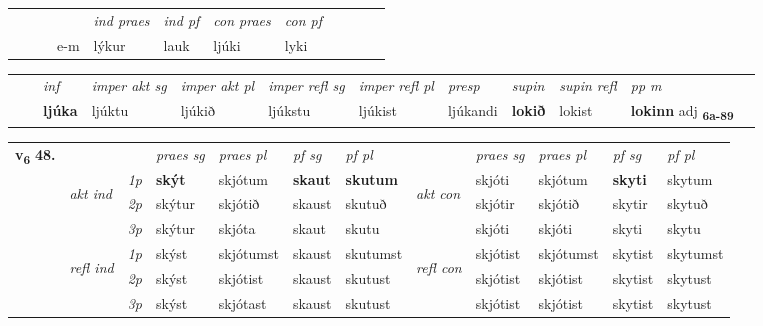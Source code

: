 \begin{tabular}{llllllllllll}
 & &  & &  \textit{ind praes} & \textit{ind pf} & \textit{con praes} & \textit{con pf} \\*
&  & & e-m & lýkur & lauk & ljúki & lyki \\*
\cmidrule{5-9}
\end{tabular}


\begin{tabular}{llllllllllll}
 & & \textit{inf} & \textit{imper akt sg} & \textit{imper akt pl} & \textit{imper refl sg} & \textit{imper refl pl} & \textit{presp} & \textit{supin} & \textit{supin refl} & \textit{pp m}     \\*
  & & \textbf{ljúka} & ljúktu  & ljúkið & ljúkstu & ljúkist & ljúkandi &  \textbf{lokið} & lokist & \textbf{lokinn} adj \textbf{\textsubscript{6a-89}} \\*
\cmidrule{1-12}
\end{tabular}



\begin{tabular}{llllllllllll} \toprule
\multirow{4}{*}{{{\textbf{v{\textsubscript{6}}} \Large{\textbf{48.}}}}}  & &   &  \textit{praes sg}  & \textit{praes pl}  &\textit{ pf sg} & \textit{pf pl} &  &  \textit{praes sg}  & \textit{praes pl}  & \textit{pf sg} & \textit{pf pl } \\*
	\cmidrule{4-7} \cmidrule{9-12}
 & \multirow{3}{*}{\begin{turn}{90}\textit{akt ind}\end{turn}} & {\textit{1p}} & \textbf{skýt} & skjótum    & \textbf{skaut} & \textbf{skutum} & \multirow{3}{*}{\begin{turn}{90}\textit{akt con}\end{turn}} &skjóti & skjótum & \textbf{skyti} & skytum\\*
& &  {\textit{2p}} &  skýtur  & skjótið   & skaust & skutuð & & skjótir & skjótið & skytir & skytuð \\*
& &  {\textit{3p}} & skýtur & skjóta   & skaut & skutu & & skjóti & skjóti& skyti & skytu  \\*
\cmidrule{4-7} \cmidrule{9-12}
 &\multirow{3}{*}{\begin{turn}{90}\textit{refl ind}\end{turn}} & {\textit{1p}} & skýst & skjótumst    & skaust & skutumst & \multirow{3}{*}{\begin{turn}{90}\textit{refl con}\end{turn}}  &skjótist & skjótumst & skytist & skytumst\\*
 &&  {\textit{2p}} &  skýst  & skjótist   & skaust & skutust & &skjótist & skjótist & skytist & skytust \\*
& &  {\textit{3p}} & skýst & skjótast   & skaust & skutust & & skjótist & skjótist& skytist & skytust  \\*
\cmidrule{4-7} \cmidrule{9-12}
\end{tabular}


